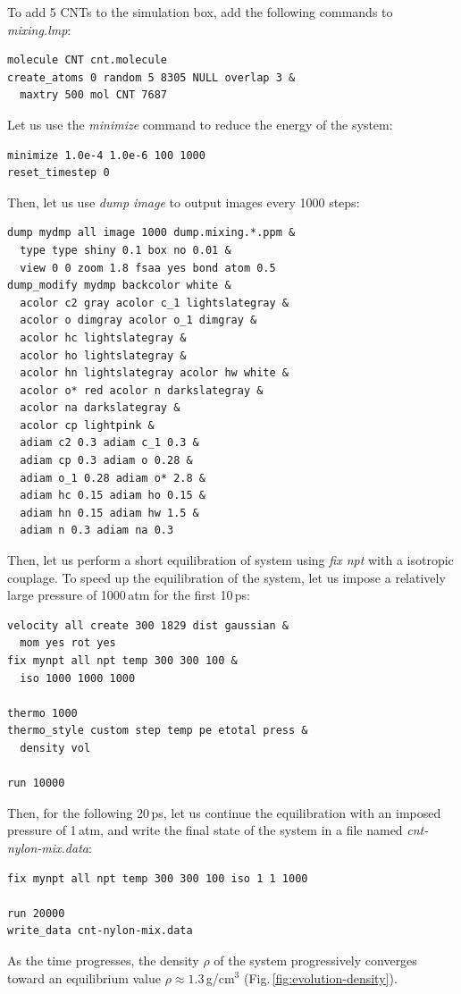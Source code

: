 \documentclass[9pt,tutorial]{livecoms}
\begin{document}
To add 5 CNTs to the simulation box, add the following commands
to \textit{mixing.lmp}:
{\normalsize
\begin{verbatim}
molecule CNT cnt.molecule
create_atoms 0 random 5 8305 NULL overlap 3 &
  maxtry 500 mol CNT 7687
\end{verbatim}
}
Let us use the \textit{minimize} command to reduce the energy of the system:
{\normalsize
\begin{verbatim}
minimize 1.0e-4 1.0e-6 100 1000
reset_timestep 0
\end{verbatim}
}
Then, let us use \textit{dump image} to output images every 1000 steps:
{\normalsize
\begin{verbatim}
dump mydmp all image 1000 dump.mixing.*.ppm &
  type type shiny 0.1 box no 0.01 &
  view 0 0 zoom 1.8 fsaa yes bond atom 0.5
dump_modify mydmp backcolor white &
  acolor c2 gray acolor c_1 lightslategray &
  acolor o dimgray acolor o_1 dimgray &
  acolor hc lightslategray &
  acolor ho lightslategray &
  acolor hn lightslategray acolor hw white &
  acolor o* red acolor n darkslategray &
  acolor na darkslategray &
  acolor cp lightpink &
  adiam c2 0.3 adiam c_1 0.3 &
  adiam cp 0.3 adiam o 0.28 &
  adiam o_1 0.28 adiam o* 2.8 &
  adiam hc 0.15 adiam ho 0.15 &
  adiam hn 0.15 adiam hw 1.5 &
  adiam n 0.3 adiam na 0.3 
\end{verbatim}
}
Then, let us perform a short equilibration of system using \textit{fix npt}
with a isotropic couplage. To speed up the equilibration of the system, let us 
impose a relatively large pressure of 1000\,atm for the first 10\,ps:
{\normalsize
\begin{verbatim}
velocity all create 300 1829 dist gaussian &
  mom yes rot yes
fix mynpt all npt temp 300 300 100 &
  iso 1000 1000 1000

thermo 1000
thermo_style custom step temp pe etotal press &
  density vol

run 10000
\end{verbatim}
}
Then, for the following 20\,ps, let us continue the equilibration
with an imposed pressure of 1\,atm, and write the final state of the
system in a file named \textit{cnt-nylon-mix.data}:
{\normalsize
\begin{verbatim}
fix mynpt all npt temp 300 300 100 iso 1 1 1000

run 20000
write_data cnt-nylon-mix.data
\end{verbatim}
}
As the time progresses, the density $\rho$ of the system progressively
converges toward an equilibrium value $\rho \approx 1.3$\,g/cm$^3$
(Fig.\,\ref{fig:evolution-density}).
\end{document}
